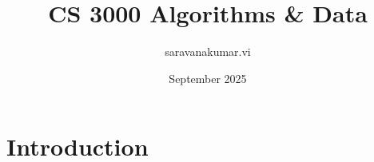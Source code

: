 \documentclass{article}
\title{CS 3000 Algorithms & Data}
\author{saravanakumar.vi }
\date{September 2025}
\begin{document}
\maketitle

\section{Introduction}
\end{document}
